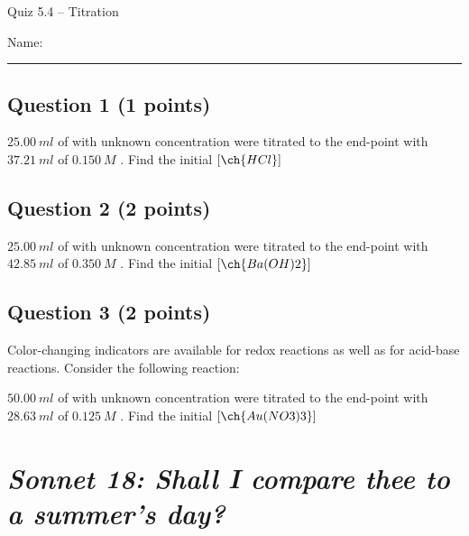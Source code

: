 \documentclass[11pt, letterpaper]{memoir}
\begin{document}
	\begin{center}
		{\large	Quiz 5.4 -- Titration}
	\end{center}
{\large Name: \rule[-1mm]{4in}{.1pt}
	
	\subsection*{Question 1 (1 points)}
	$25.00~ml$ of  with unknown concentration were titrated to the end-point with $37.21~ml$ of $0.150~M$ . Find the initial $\left[\ch{HCl}\right]$
	
	\vspace{9em}
	\subsection*{Question 2 (2 points)}
	$25.00~ml$ of  with unknown concentration were titrated to the end-point with $42.85~ml$ of $0.350~M$ . Find the initial $\left[\ch{Ba(OH)2}\right]$
	
	\vspace{10em}
	\subsection*{Question 3 (2 points)}
	Color-changing indicators are available for redox reactions as well as for acid-base reactions. Consider the following reaction:
	
	
	\noindent $50.00~ml$ of  with unknown concentration were titrated to the end-point with $28.63~ml$ of $0.125~M$ . Find the initial $\left[\ch{Au(NO3)3}\right]$

\newpage
\pagestyle{empty}
\addtocounter{page}{-1}
\section*{\emph{Sonnet 18: Shall I compare thee to a summer’s day?}}
}
\end{document}
